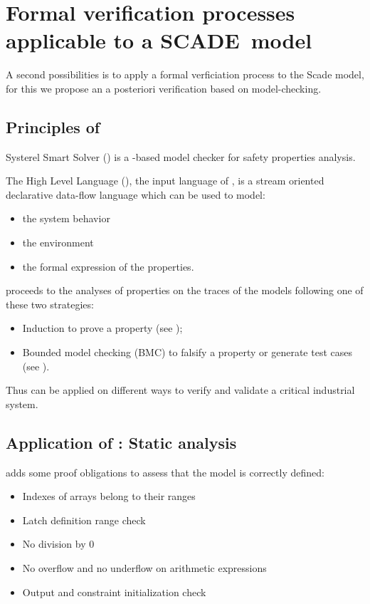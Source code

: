 \section{Formal verification processes applicable to a SCADE~model}

A second possibilities is to apply a formal verficiation process to  the Scade model, for this we propose an a posteriori verification based on model-checking.



\subsection{Principles of \smartsolver{}}

Systerel Smart Solver (\smartsolver{}) is a  \SAT{}-based
model checker for safety properties analysis. 

The High Level Language (\HLL{}), the input language of \smartsolver{}, is a stream oriented declarative data-flow language which can be used to  model:

\begin{itemize}
\item the system behavior
\item the environment
\item the formal expression of the properties.
\end{itemize}

\smartsolver{} proceeds to  the analyses of properties on the traces of the \HLL{} models following one of these two strategies:
\begin{itemize}
\item Induction to prove a property (see \cite{Sheeran:2000});
\item Bounded model checking (BMC) to falsify a property or generate test cases (see \cite{Biere:1999,Amla:2005}).
\end{itemize}

Thus \smartsolver{} can be applied on different ways to  verify and validate a critical industrial  system.


\subsection{Application of \smartsolver{}: Static analysis}
\label{sec:static-analysis}

\smartsolver{} adds some proof obligations to assess that the \HLL{}
model is correctly defined:
\begin{itemize}
\item Indexes of arrays belong to their ranges
\item Latch definition range check
\item No division by 0
\item No overflow and no underflow on arithmetic expressions
\item Output and constraint initialization check
\end{itemize}


